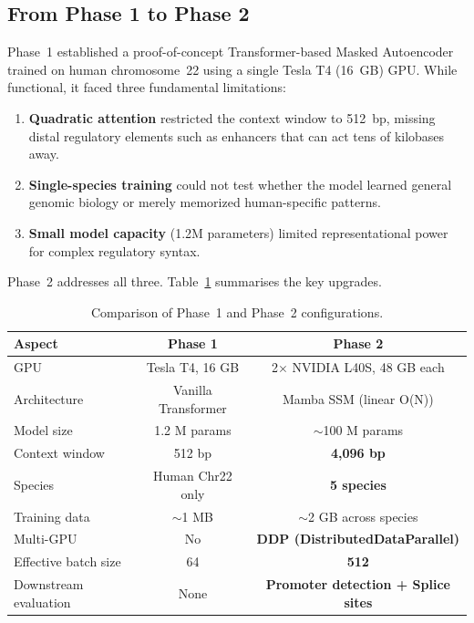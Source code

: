 \documentclass[11pt,a4paper,twoside]{article}
\begin{document}
\subsection{From Phase 1 to Phase 2}

Phase~1 established a proof-of-concept Transformer-based Masked Autoencoder
trained on human chromosome~22 using a single Tesla T4 (16~GB) GPU. While
functional, it faced three fundamental limitations:
\begin{enumerate}
    \item \textbf{Quadratic attention} restricted the context window to
          512~bp, missing distal regulatory elements such as enhancers that
          can act tens of kilobases away.
    \item \textbf{Single-species training} could not test whether the model
          learned general genomic biology or merely memorized human-specific
          patterns.
    \item \textbf{Small model capacity} (1.2M parameters) limited
          representational power for complex regulatory syntax.
\end{enumerate}

Phase~2 addresses all three. Table~\ref{tab:phase_comparison} summarises the
key upgrades.

\begin{table}[ht]
\centering
\caption{Comparison of Phase~1 and Phase~2 configurations.}
\label{tab:phase_comparison}
\small
\begin{tabular}{lcc}
\toprule
\textbf{Aspect} & \textbf{Phase 1} & \textbf{Phase 2} \\
\midrule
GPU & Tesla T4, 16 GB & 2$\times$ NVIDIA L40S, 48 GB each \\
Architecture & Vanilla Transformer & Mamba SSM (linear O(N)) \\
Model size & 1.2 M params & $\sim$100 M params \\
Context window & 512 bp & \textbf{4,096 bp} \\
Species & Human Chr22 only & \textbf{5 species} \\
Training data & $\sim$1 MB & $\sim$2 GB across species \\
Multi-GPU & No & \textbf{DDP (DistributedDataParallel)} \\
Effective batch size & 64 & \textbf{512} \\
Downstream evaluation & None & \textbf{Promoter detection + Splice sites} \\
\bottomrule
\end{tabular}
\end{table}
\end{document}
